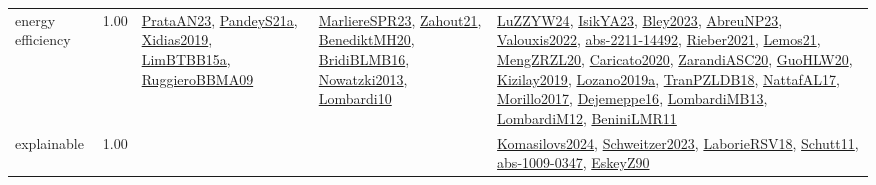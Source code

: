 {\begin{longtable}{p{3cm}r>{\raggedright\arraybackslash}p{6cm}>{\raggedright\arraybackslash}p{6cm}>{\raggedright\arraybackslash}p{8cm}}
\index{energy efficiency}\index{Concepts!energy efficiency}energy efficiency &  1.00 & \hyperref[detail:PrataAN23]{PrataAN23}, \hyperref[detail:PandeyS21a]{PandeyS21a}, \hyperref[detail:Xidias2019]{Xidias2019}, \hyperref[detail:LimBTBB15a]{LimBTBB15a}, \hyperref[detail:RuggieroBBMA09]{RuggieroBBMA09} & \hyperref[detail:MarliereSPR23]{MarliereSPR23}, \hyperref[detail:Zahout21]{Zahout21}, \hyperref[detail:BenediktMH20]{BenediktMH20}, \hyperref[detail:BridiBLMB16]{BridiBLMB16}, \hyperref[detail:Nowatzki2013]{Nowatzki2013}, \hyperref[detail:Lombardi10]{Lombardi10} & \hyperref[detail:LuZZYW24]{LuZZYW24}, \hyperref[detail:IsikYA23]{IsikYA23}, \hyperref[detail:Bley2023]{Bley2023}, \hyperref[detail:AbreuNP23]{AbreuNP23}, \hyperref[detail:Valouxis2022]{Valouxis2022}, \hyperref[detail:abs-2211-14492]{abs-2211-14492}, \hyperref[detail:Rieber2021]{Rieber2021}, \hyperref[detail:Lemos21]{Lemos21}, \hyperref[detail:MengZRZL20]{MengZRZL20}, \hyperref[detail:Caricato2020]{Caricato2020}, \hyperref[detail:ZarandiASC20]{ZarandiASC20}, \hyperref[detail:GuoHLW20]{GuoHLW20}, \hyperref[detail:Kizilay2019]{Kizilay2019}, \hyperref[detail:Lozano2019a]{Lozano2019a}, \hyperref[detail:TranPZLDB18]{TranPZLDB18}, \hyperref[detail:NattafAL17]{NattafAL17}, \hyperref[detail:Morillo2017]{Morillo2017}, \hyperref[detail:Dejemeppe16]{Dejemeppe16}, \hyperref[detail:LombardiMB13]{LombardiMB13}, \hyperref[detail:LombardiM12]{LombardiM12}, \hyperref[detail:BeniniLMR11]{BeniniLMR11}\\
\index{explainable}\index{Concepts!explainable}explainable &  1.00 &  &  & \hyperref[detail:Komasilovs2024]{Komasilovs2024}, \hyperref[detail:Schweitzer2023]{Schweitzer2023}, \hyperref[detail:LaborieRSV18]{LaborieRSV18}, \hyperref[detail:Schutt11]{Schutt11}, \hyperref[detail:abs-1009-0347]{abs-1009-0347}, \hyperref[detail:EskeyZ90]{EskeyZ90}\\

\end{longtable}}
